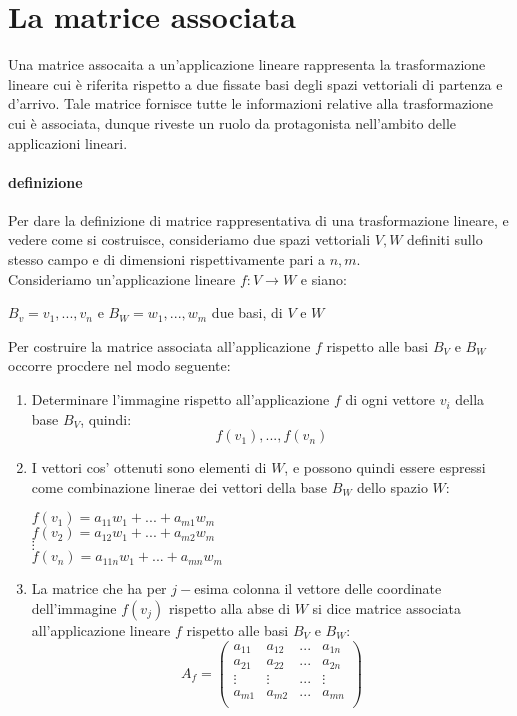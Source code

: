 \section{La matrice associata}
Una matrice assocaita a un'applicazione lineare rappresenta la trasformazione lineare cui è riferita rispetto a due fissate basi degli spazi vettoriali di partenza e d'arrivo.
Tale matrice fornisce tutte le informazioni relative alla trasformazione cui è associata, dunque riveste un ruolo da protagonista nell'ambito delle applicazioni lineari.

\paragraph{definizione}
Per dare la definizione di matrice rappresentativa di una trasformazione lineare, e vedere come si costruisce, consideriamo due spazi vettoriali $V,W$ definiti sullo stesso campo e di dimensioni rispettivamente pari a $n,m$.
\\Consideriamo un'applicazione lineare $f:V\to W$ e siano:
\begin{center}
	$B_v = {v_1,...,v_n}$ e $B_W={w_1,...,w_m}$ due basi, di $V$ e $W$
\end{center}
Per costruire la matrice associata all'applicazione $f$ rispetto alle basi $B_V$ e $B_W$ occorre procdere nel modo seguente:
\begin{enumerate}
	\item Determinare l'immagine rispetto all'applicazione $f$ di ogni vettore $v_i$ della base $B_V$, quindi:
	      \[ f(v_1),...,f(v_n)\]
	\item I vettori cos' ottenuti sono elementi di $W$, e possono quindi essere espressi come combinazione linerae dei vettori della base $B_W$ dello spazio $W$:
	\begin{center}
        $f(v_1) = a_{11}w_1 + ... + a_{m1}w_m $
        \\ $f(v_2) = a_{12}w_1 + ... + a_{m2}w_m $
        \\$ \vdots$
        \\$f(v_n) = a_{11n}w_1 + ... + a_{mn}w_m $
    \end{center}
    \item La matrice che ha per $j-$esima colonna il vettore delle coordinate dell'immagine $f(v_j)$ rispetto alla abse di $W$ si dice matrice associata all'applicazione lineare $f$ rispetto alle basi $B_V$ e $B_W$:
    \[ A_f = 
        \begin{pmatrix}
            a_{11} & a_{12} & ... & a_{1n} \\
            a_{21} & a_{22} & ... & a_{2n} \\
            \vdots & \vdots & ... & \vdots \\
            a_{m1} & a_{m2} & ... & a_{mn} \\
        \end{pmatrix}
    \]
\end{enumerate}


